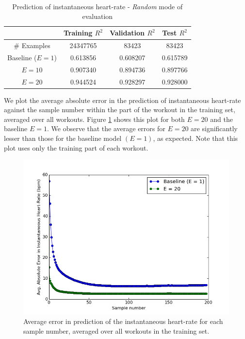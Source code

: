 \documentclass{acm_proc_article-sp}
\begin{document}
\begin{table}[H]
\centering
\begin{tabular}{|c|c|c|c|} \hline
& Training $R^2$ & Validation $R^2$ & Test $R^2$ \\ \hline
\# Examples & 24347765  & 83423  & 83423  \\ \hline
Baseline ($E = 1$) & 0.613856 & 0.608207 & 0.615789 \\ \hline
$E = 10$ & 0.907340 & 0.894736 & 0.897766 \\ \hline
$E = 20$ & 0.944524 & 0.928297 & 0.928000 \\ \hline
\end{tabular}
\caption{Prediction of instantaneous heart-rate - \emph{Random} mode of evaluation }
\label{tableInstHrRandom}
\end{table}

We plot the average absolute error in the prediction of instantaneous heart-rate against the sample number within the part of the workout in the training set, averaged over all workouts. Figure \ref{figInstHrErrorVsSample} shows this plot for both $E = 20$ and the baseline $E = 1$. We observe that the average errors for $E = 20$ are significantly lesser than those for the baseline model $(E = 1)$, as expected. Note that this plot uses only the training part of each workout.

\begin{figure}[h]
\centering
\includegraphics[scale=0.4]{../src/plots/insthr_error_vs_sample_comparison}
\caption{\label{figInstHrErrorVsSample} Average error in prediction of the instantaneous heart-rate for each sample number, averaged over all workouts in the training set.}
\end{figure}
\end{document}
